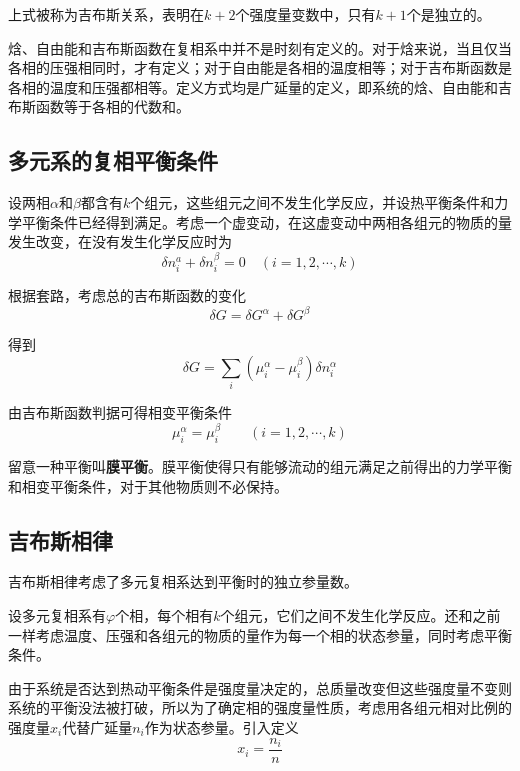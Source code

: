 \documentclass[UTF8]{ctexart}
\begin{document}
\noindent 上式被称为吉布斯关系，表明在$ k+2 $个强度量变数中，只有$ k+1 $个是独立的。

	焓、自由能和吉布斯函数在复相系中并不是时刻有定义的。对于焓来说，当且仅当各相的压强相同时，才有定义；对于自由能是各相的温度相等；对于吉布斯函数是各相的温度和压强都相等。定义方式均是广延量的定义，即系统的焓、自由能和吉布斯函数等于各相的代数和。
	
	\subsection{多元系的复相平衡条件}
	设两相$ \alpha $和$ \beta $都含有$ k $个组元，这些组元之间不发生化学反应，并设热平衡条件和力学平衡条件已经得到满足。考虑一个虚变动，在这虚变动中两相各组元的物质的量发生改变，在没有发生化学反应时为
	\begin{equation}
	\delta n_{i}^{a}+\delta n_{i}^{\beta}=0 \quad(i=1,2, \cdots, k)
	\end{equation}
	
\noindent 根据套路，考虑总的吉布斯函数的变化
\begin{equation}
\delta G=\delta G^{\alpha}+\delta G^{\beta}
\end{equation}

\noindent 得到
\begin{equation}
\delta G=\sum_{i}\left(\mu_{i}^{\alpha}-\mu_{i}^{\beta}\right) \delta n_{i}^{\alpha}
\end{equation}

\noindent 由吉布斯函数判据可得相变平衡条件
\begin{equation}
\mu_{i}^{\alpha}=\mu_{i}^{\beta} \qquad(i=1,2, \cdots, k)
\end{equation}

	留意一种平衡叫\textbf{膜平衡}。膜平衡使得只有能够流动的组元满足之前得出的力学平衡和相变平衡条件，对于其他物质则不必保持。
	
	\subsection{吉布斯相律}
	吉布斯相律考虑了多元复相系达到平衡时的独立参量数。
	
	设多元复相系有$ \varphi $个相，每个相有$ k $个组元，它们之间不发生化学反应。还和之前一样考虑温度、压强和各组元的物质的量作为每一个相的状态参量，同时考虑平衡条件。
	
	由于系统是否达到热动平衡条件是强度量决定的，总质量改变但这些强度量不变则系统的平衡没法被打破，所以为了确定相的强度量性质，考虑用各组元相对比例的强度量$ x_{i} $代替广延量$ n_{i} $作为状态参量。引入定义
	\begin{equation}
	x_{i}=\frac{n_{i}}{n}
	\end{equation}
	
\end{document}

